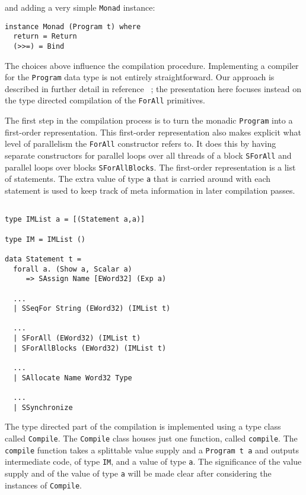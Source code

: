 and adding a very simple {\tt Monad} instance:

\begin{small} 
\begin{verbatim} 
instance Monad (Program t) where
  return = Return
  (>>=) = Bind
\end{verbatim} 
\end{small} 

The choices above influence the compilation procedure. Implementing a compiler 
for the {\tt Program} data type is not entirely straightforward. Our approach 
is described in further detail in reference ~; the presentation 
here focuses instead on the type directed compilation of the {\tt ForAll} 
primitives.  


The first step in the compilation process is to turn the monadic {\tt Program}
into a first-order representation. This first-order representation also makes 
explicit what level of parallelism the {\tt ForAll} constructor refers to. 
It does this by having separate constructors for parallel loops over 
all threads of a block {\tt SForAll} and parallel loops over blocks 
{\tt SForAllBlocks}. The first-order representation is a list of statements. 
The extra value of type {\tt a} that is carried around with each statement 
is used to keep track of meta information in later compilation passes. 

\begin{small}
\begin{Verbatim}[samepage=true]

type IMList a = [(Statement a,a)]

type IM = IMList ()

data Statement t =
  forall a. (Show a, Scalar a) 
     => SAssign Name [EWord32] (Exp a)
  
  ... 
  | SSeqFor String (EWord32) (IMList t)
 
  ... 
  | SForAll (EWord32) (IMList t) 
  | SForAllBlocks (EWord32) (IMList t)
   
  ... 
  | SAllocate Name Word32 Type
 
  ... 
  | SSynchronize

\end{Verbatim} 
\end{small}

The type directed part of the compilation is implemented using a type class 
called {\tt Compile}. The {\tt Compile} class houses just one function, called
{\tt compile}. The {\tt compile} function takes a splittable value supply and 
a {\tt Program t a} and outputs intermediate code, of type {\tt IM}, and a 
value of type {\tt a}. The significance of the value supply and of the value 
of type {\tt a} will be made clear after considering the instances of 
{\tt Compile}.  

